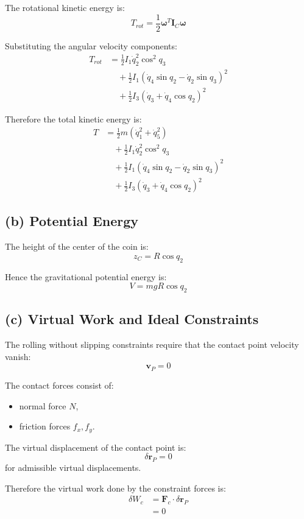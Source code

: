 The rotational kinetic energy is:
\[
T_{rot}
=
\frac12\bm{\omega}^T\mathbf{I}_C\bm{\omega}
\]

Substituting the angular velocity components:
\begin{align}
T_{rot}
&=
\frac12 I_1\dot q_2^2\cos^2 q_3
\\
&\quad
+
\frac12 I_1(\dot q_4\sin q_2-\dot q_2\sin q_3)^2
\\
&\quad
+
\frac12 I_3(\dot q_3+\dot q_4\cos q_2)^2
\end{align}

Therefore the total kinetic energy is:
\begin{align}
T
&=
\frac12 m(\dot q_1^2+\dot q_5^2)
\\
&\quad
+
\frac12 I_1\dot q_2^2\cos^2 q_3
\\
&\quad
+
\frac12 I_1(\dot q_4\sin q_2-\dot q_2\sin q_3)^2
\\
&\quad
+
\frac12 I_3(\dot q_3+\dot q_4\cos q_2)^2
\end{align}

\subsection*{(b) Potential Energy}

The height of the center of the coin is:
\[
z_C = R\cos q_2
\]

Hence the gravitational potential energy is:
\[
V = mgR\cos q_2
\]

\subsection*{(c) Virtual Work and Ideal Constraints}

The rolling without slipping constraints require that the contact point velocity vanish:
\[
\mathbf{v}_P = 0
\]

The contact forces consist of:
\begin{itemize}
    \item normal force $N$,
    \item friction forces $f_x, f_y$.
\end{itemize}

The virtual displacement of the contact point is:
\[
\delta\mathbf{r}_P = 0
\]
for admissible virtual displacements.

Therefore the virtual work done by the constraint forces is:
\begin{align}
\delta W_c
&=
\mathbf{F}_c\cdot\delta\mathbf{r}_P
\\
&=0
\end{align}

